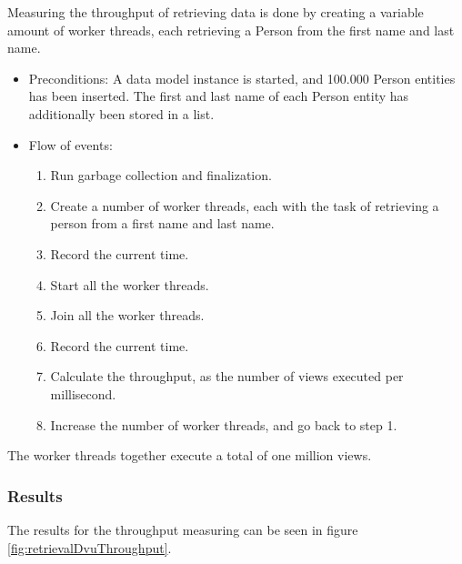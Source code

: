 Measuring the throughput of retrieving data is done by creating a
variable amount of worker threads, each retrieving a Person from the
first name and last name.
\begin{itemize}
\item Preconditions: A data model instance is started, and 100.000 Person
entities has been inserted. The first and last name of each Person
entity has additionally been stored in a list.
\item Flow of events:

\begin{enumerate}
\item Run garbage collection and finalization.
\item Create a number of worker threads, each with the task of retrieving
a person from a first name and last name.
\item Record the current time.
\item Start all the worker threads.
\item Join all the worker threads.
\item Record the current time.
\item Calculate the throughput, as the number of views executed per millisecond.
\item Increase the number of worker threads, and go back to step 1.
\end{enumerate}
\end{itemize}
The worker threads together execute a total of one million views.


\subsubsection{Results}

The results for the throughput measuring can be seen in figure \ref{fig:retrievalDvuThroughput}.


